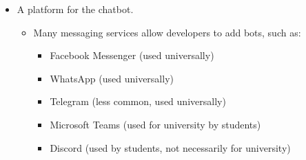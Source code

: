 \documentclass[12pt]{report}
\begin{document}
\begin{itemize}
        \item A platform for the chatbot.
        \begin{itemize}
            \item Many messaging services allow developers to add bots, such as:
            \begin{itemize}
                \item Facebook Messenger (used universally)
                \item WhatsApp (used universally)
                \item Telegram (less common, used universally)
                \item Microsoft Teams (used for university by students)
                \item Discord (used by students, not necessarily for university)
            \end{itemize}
        \end{itemize}

    \end{itemize}
\end{document}
